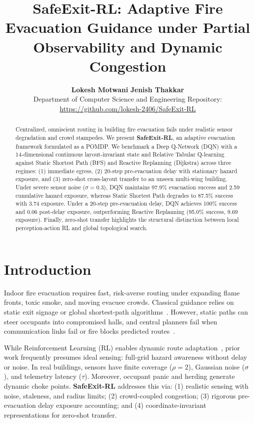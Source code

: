 \documentclass[10pt,twocolumn]{article}
\title{\vspace{-3.2em}\textbf{\large SafeExit-RL: Adaptive Fire Evacuation Guidance under Partial Observability and Dynamic Congestion}\vspace{-0.9em}}
\author{
  \textbf{Lokesh Motwani} \quad \textbf{Jenish Thakkar} \\
  \small Department of Computer Science and Engineering \quad Repository: \url{https://github.com/lokesh-2406/SafeExit-RL}
}
\date{}
\begin{document}
\maketitle

\begin{abstract}
Centralized, omniscient routing in building fire evacuation fails under realistic sensor degradation and crowd stampedes. We present \textbf{SafeExit-RL}, an adaptive evacuation framework formulated as a POMDP. We benchmark a Deep Q-Network (DQN) with a 14-dimensional continuous layout-invariant state and Relative Tabular Q-learning against Static Shortest Path (BFS) and Reactive Replanning (Dijkstra) across three regimes: (1) immediate egress, (2) 20-step pre-evacuation delay with stationary hazard exposure, and (3) zero-shot cross-layout transfer to an unseen multi-wing building. Under severe sensor noise ($\sigma{=}0.3$), DQN maintains 97.9\% evacuation success and 2.59 cumulative hazard exposure, whereas Static Shortest Path degrades to 87.5\% success with 3.74 exposure. Under a 20-step pre-evacuation delay, DQN achieves 100\% success and 0.06 post-delay exposure, outperforming Reactive Replanning (95.0\% success, 9.69 exposure). Finally, zero-shot transfer highlights the structural distinction between local perception-action RL and global topological search.
\end{abstract}

\section{Introduction}
Indoor fire evacuation requires fast, risk-averse routing under expanding flame fronts, toxic smoke, and moving evacuee crowds. Classical guidance relies on static exit signage or global shortest-path algorithms~\cite{safestep}. However, static paths can steer occupants into compromised halls, and central planners fail when communication links fail or fire blocks predicted routes~\cite{pomdp_planning}.

While Reinforcement Learning (RL) enables dynamic route adaptation~\cite{rl_evacuation}, prior work frequently presumes ideal sensing: full-grid hazard awareness without delay or noise. In real buildings, sensors have finite coverage ($\rho{=}2$), Gaussian noise ($\sigma$), and telemetry latency ($\tau$). Moreover, occupant panic and herding generate dynamic choke points. \textbf{SafeExit-RL} addresses this via: (1) realistic sensing with noise, staleness, and radius limits; (2) crowd-coupled congestion; (3) rigorous pre-evacuation delay exposure accounting; and (4) coordinate-invariant representations for zero-shot transfer.
\end{document}
